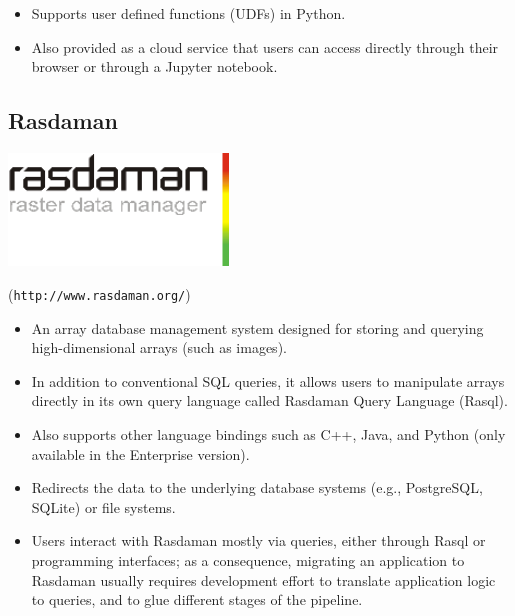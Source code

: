\documentclass[a0,landscape]{a0poster}
\begin{document}
\begin{multicols}{3}
\begin{itemize}
   \item Supports user defined functions (UDFs) in Python.

   \item Also provided as a cloud service that users can access directly through their browser or through a Jupyter notebook.

\end{itemize}
\begin{minipage}[b]{0.75\linewidth}
  \subsection*{Rasdaman}
\end{minipage}
\begin{minipage}[b]{0.25\linewidth}
  \includegraphics[height=3cm]{rasdaman-logo.png}
\end{minipage}

(\texttt{http://www.rasdaman.org/})
\begin{itemize}
\item An array database management system designed for storing and querying high-dimensional arrays (such as images).

\item In addition to conventional SQL queries, it allows users to manipulate arrays directly in its own query language called Rasdaman Query Language (Rasql).

\item Also supports other language bindings such as C++, Java, and Python (only available in the Enterprise version).

\item Redirects the data to the underlying database systems (e.g., PostgreSQL, SQLite) or file systems.

\item Users interact with Rasdaman mostly via queries, either through Rasql or programming interfaces; as a consequence, migrating an application to Rasdaman usually requires development effort to translate application logic to queries, and to glue different stages of the pipeline.
\end{itemize}


\end{multicols}
\end{document}
